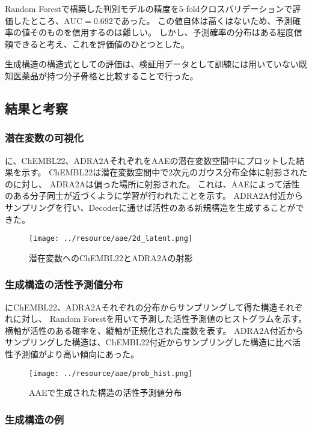 Random Forestで構築した判別モデルの精度を5-foldクロスバリデーションで評価したところ、$\mathrm{AUC} = 0.692$であった。
この値自体は高くはないため、予測確率の値そのものを信用するのは難しい。
しかし、予測確率の分布はある程度信頼できると考え、これを評価値のひとつとした。

生成構造の構造式としての評価は、検証用データとして訓練には用いていない既知医薬品が持つ分子骨格と比較することで行った。

\subsection{結果と考察}

\subsubsection{潜在変数の可視化}

に、ChEMBL22、ADRA2AそれぞれをAAEの潜在変数空間中にプロットした結果を示す。
ChEMBL22は潜在変数空間中で2次元のガウス分布全体に射影されたのに対し、
ADRA2Aは偏った場所に射影された。
これは、AAEによって活性のある分子同士が近づくように学習が行われたことを示す。
ADRA2A付近からサンプリングを行い、Decoderに通せば活性のある新規構造を生成することができた。
\begin{figure}[tbp]
    \centering
    \texttt{[image: ../resource/aae/2d\_latent.png]}
    \caption{潜在変数へのChEMBL22とADRA2Aの射影} \label{fig:2d_latent}
\end{figure}

\subsubsection{生成構造の活性予測値分布}

にChEMBL22、ADRA2Aそれぞれの分布からサンプリングして得た構造それぞれに対し、
Random Forestを用いて予測した活性予測値のヒストグラムを示す。横軸が活性のある確率を、縦軸が正規化された度数を表す。
ADRA2A付近からサンプリングした構造は、ChEMBL22付近からサンプリングした構造に比べ活性予測値がより高い傾向にあった。
\begin{figure}[tbp]
    \centering
    \texttt{[image: ../resource/aae/prob\_hist.png]}
    \caption{AAEで生成された構造の活性予測値分布} \label{fig:aae_prob_hist}
\end{figure}

\subsubsection{生成構造の例}

